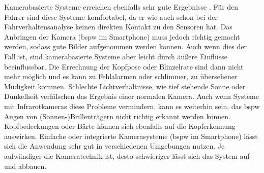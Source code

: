 {Kamerabasierte Systeme erreichen ebenfalls sehr gute Ergebnisse \cite{Bergasa_1603553}. Für den Fahrer sind diese Systeme komfortabel, da er wie auch schon bei der Fahrverhaltensanalyse keinen direkten Kontakt zu den Sensoren hat. Das Anbringen der Kamera (\acl{bspw} im Smartphone) muss jedoch richtig gemacht werden, sodass gute Bilder aufgenommen werden können. Auch wenn dies der Fall ist, sind kamerabasierte Systeme aber leicht durch äußere Einflüsse beeinflussbar. Die Errechnung der Kopfpose oder Blinzelrate sind dann nicht mehr möglich und es kann zu Fehlalarmen oder schlimmer, zu übersehener Müdigkeit kommen. Schlechte Lichtverhältnisse, wie tief stehende Sonne oder Dunkelheit verfälschen das Ergebnis einer normalen Kamera. Auch wenn Systeme mit Infrarotkameras diese Probleme vermindern, kann es weiterhin sein, das \acl{bspw} Augen von (Sonnen-)Brillenträgern nicht richtig erkannt werden können. Kopfbedeckungen oder Bärte können sich ebenfalls auf die Kopferkennung auswirken. Einfache oder integrierte Kamerasysteme (\acl{bspw} im Smartphone) lässt sich die Anwendung sehr gut in verschiedenen Umgebungen nutzen. Je aufwändiger die Kameratechnik ist, desto schwieriger lässt sich das System auf- und abbauen. \\

}
